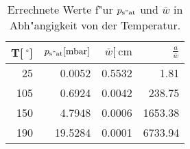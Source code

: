 
\begin{table}[!h]
\begin{center}
\begin{tabular}{|r|r|r|r|}
\hline
T[$\SI{}{^\circ}$] & $p_\mathrm{s"at}[\SI{}{\milli\bar}]$ & $\bar{w}[\SI{}{\centi\meter}$ & $\frac{a}{\bar{w}}$\\
\hline
\hline
25  & 0.0052  & 0.5532 & 1.81\\
105 & 0.6924  & 0.0042 & 238.75\\
150 & 4.7948  & 0.0006 & 1653.38\\
190 & 19.5284 & 0.0001 & 6733.94\\
\hline
\end{tabular}
\caption[]{Errechnete Werte f"ur $p_\mathrm{s"at}$ und $\bar{w}$ in Abh"angigkeit von der Temperatur.}
\label{tab:weg}
\end{center}
\end{table}